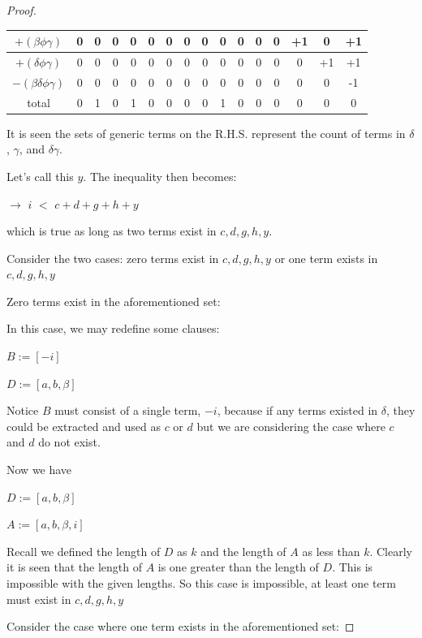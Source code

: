 \documentclass[manuscript]{acmart}
\begin{document}
\begin{proof}
\begin{center}
\begin{tabular}{ |c|c|c|c|c|c|c|c|c|c|c|c|c|c|c|c| }
                $+ (\beta \phi \gamma)$ & 0 & 0 & 0 & 0 & 0 & 0 & 0 & 0 & 0 & 0 & 0 & 0 & +1 & 0 & +1 \\
                \hline
                $+ (\delta \phi \gamma)$ & 0 & 0 & 0 & 0 & 0 & 0 & 0 & 0 & 0 & 0 & 0 & 0 & 0 & +1 & +1 \\
                \hline
                $- (\beta \delta \phi \gamma)$ & 0 & 0 & 0 & 0 & 0 & 0 & 0 & 0 & 0 & 0 & 0 & 0 & 0 & 0 & -1 \\
                \hline
                total & 0 & 1 & 0 & 1 & 0 & 0 & 0 & 0 & 1 & 0 & 0 & 0 & 0 & 0 & 0 \\
                \hline
            \end{tabular}
        \end{center}

        It is seen the sets of generic terms on the R.H.S. represent the count of terms in $\delta$, $\gamma$, and $\delta \gamma$.

        Let's call this $y$. The inequality then becomes:

        $\rightarrow$ $i$
        $<$
        $c + d + g + h + y
        $

        which is true as long as two terms exist in {$c, d, g, h, y$}.

        Consider the two cases: zero terms exist in {$c, d, g, h, y$} or one term exists in {$c, d, g, h, y$}

        Zero terms exist in the aforementioned set:

        In this case, we may redefine some clauses:

        $B := [-i]$

        $D := [a, b, \beta]$

        Notice $B$ must consist of a single term, $-i$, because if any terms existed in $\delta$, they could be extracted and used as $c$ or $d$ but we are considering the case where $c$ and $d$ do not exist.

        Now we have 
        
        $D := [a, b, \beta]$

        $A := [a, b, \beta, i]$

        Recall we defined the length of $D$ as $k$ and the length of $A$ as less than $k$. Clearly it is seen that the length of $A$ is one greater than the length of $D$. This is impossible with the given lengths. So this case is impossible, at least one term must exist in {$c, d, g, h, y$}

        Consider the case where one term exists in the aforementioned set:


\end{proof}
\end{document}
